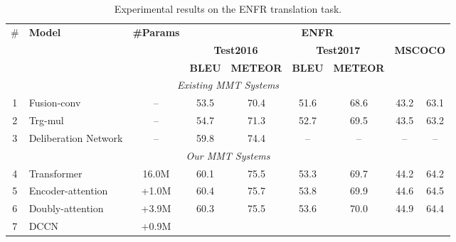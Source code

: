 \documentclass[sigconf]{acmart}
\begin{document}
\begin{table*}
\centering
\footnotesize
\begin{tabular}{c|l|c|cc|cc|cc}  
\hline
\multirow{3}{*}{\#} & \multirow{3}{*}{\bf Model} & \multirow{3}{*}{\bf\#Params} &\multicolumn{6}{c}{\textbf{ENFR}}\\
\cline{4-9}
& & &\multicolumn{2}{|c|}{\textbf{Test2016}} &\multicolumn{2}{|c|}{\textbf{Test2017}} &\multicolumn{2}{c}{\textbf{MSCOCO}}\\
\cline{4-9}
& & &\textbf{BLEU} & \textbf{METEOR} &\textbf{BLEU} & \textbf{METEOR} \\
\hline
\hline
\multicolumn{9}{c}{\emph{Existing MMT Systems}} \\
\hline
1 & Fusion-conv          \cite{caglayan2017lium} & -- & 53.5 & 70.4  & 51.6 & 68.6  & 43.2 & 63.1 \\
2 & Trg-mul              \cite{caglayan2017lium} & -- & 54.7 & 71.3  & 52.7 & 69.5  & 43.5 & 63.2  \\
3 & Deliberation Network \cite{acl19:twopass}    & -- & 59.8 & 74.4  & --   & --    & -- & --  \\
\hline
\multicolumn{9}{c}{\emph{Our MMT Systems}} \\
\hline
4 &Transformer \cite{vaswani2017attention}           &16.0M  & 60.1 & 75.5  & 53.3 & 69.7  & 44.2 & 64.2   \\
5 &Encoder-attention \cite{Delbrouck:NIPS17workshop} & +1.0M & 60.4 & 75.7  & 53.8 & 69.9  & 44.6 & 64.5    \\
6 &Doubly-attention \cite{helcl2018cuni}             & +3.9M & 60.3 & 75.5  & 53.6 & 70.0  & 44.9 & 64.4   \\
\hline
7 &DCCN & +0.9M  
&   &    
&   &  
&   & \\
\hline
\end{tabular}
\caption{
\label{Table_En2Fr}
Experimental results on the ENFR translation task.
\vspace{-10pt}
}
\end{table*}
\end{document}
